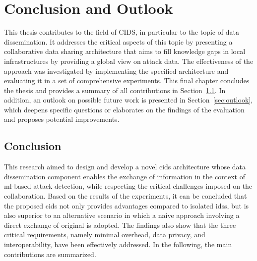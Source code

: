 \documentclass[../../main.tex]{subfiles}
\begin{document}
\chapter{Conclusion and Outlook}\label{ch:conclusion}

This thesis contributes to the field of CIDS, in particular to the topic of data dissemination. It addresses the critical aspects of this topic by presenting a collaborative data sharing architecture that aims to fill knowledge gaps in local infrastructures by providing a global view on attack data. The effectiveness of the approach was investigated by implementing the specified architecture and evaluating it in a set of comprehensive experiments. This final chapter concludes the thesis and provides a summary of all contributions in Section~\ref{sec:conclusion}. In addition, an outlook on possible future work is presented in Section~\ref{sec:outlook}, which deepens specific questions or elaborates on the findings of the evaluation and proposes potential improvements.
\newpage

\section{Conclusion}\label{sec:conclusion}
This research aimed to design and develop a novel \gls{cids} architecture whose data dissemination component enables the exchange of information in the context of \gls{ml}-based attack detection, while respecting the critical challenges imposed on the collaboration. Based on the results of the experiments, it can be concluded that the proposed \gls{cids} not only provides advantages compared to isolated \glspl{ids}, but is also superior to an alternative scenario in which a naive approach involving a direct exchange of original is adopted. The findings also show that the three critical requirements, namely minimal overhead, data privacy, and interoperability, have been effectively addressed. In the following, the main contributions are summarized.
\end{document}
